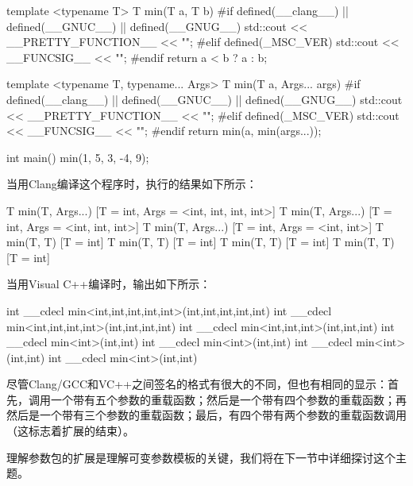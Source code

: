 \begin{cppcode}
template <typename T>
T min(T a, T b)
{
#if defined(__clang__) || defined(__GNUC__) || defined(__GNUG__)
	std::cout << __PRETTY_FUNCTION__ << "\n";
#elif defined(_MSC_VER)
	std::cout << __FUNCSIG__ << "\n";
#endif
	return a < b ? a : b;
}

template <typename T, typename... Args>
T min(T a, Args... args)
{
#if defined(__clang__) || defined(__GNUC__) || defined(__GNUG__)
	std::cout << __PRETTY_FUNCTION__ << "\n";
#elif defined(_MSC_VER)
	std::cout << __FUNCSIG__ << "\n";
#endif
	return min(a, min(args...));
}

int main()
{
	min(1, 5, 3, -4, 9);
}
\end{cppcode}

当用Clang编译这个程序时，执行的结果如下所示：

\begin{cppcode}
T min(T, Args...) [T = int, Args = <int, int, int, int>]
T min(T, Args...) [T = int, Args = <int, int, int>]
T min(T, Args...) [T = int, Args = <int, int>]
T min(T, T) [T = int]
T min(T, T) [T = int]
T min(T, T) [T = int]
T min(T, T) [T = int]
\end{cppcode}

当用Visual C++编译时，输出如下所示：

\begin{cppcode}
int __cdecl min<int,int,int,int,int>(int,int,int,int,int)
int __cdecl min<int,int,int,int>(int,int,int,int)
int __cdecl min<int,int,int>(int,int,int)
int __cdecl min<int>(int,int)
int __cdecl min<int>(int,int)
int __cdecl min<int>(int,int)
int __cdecl min<int>(int,int)
\end{cppcode}

尽管Clang/GCC和VC++之间签名的格式有很大的不同，但也有相同的显示：首先，调用一个带有五个参数的重载函数；然后是一个带有四个参数的重载函数；再然后是一个带有三个参数的重载函数；最后，有四个带有两个参数的重载函数调用（这标志着扩展的结束）。

理解参数包的扩展是理解可变参数模板的关键，我们将在下一节中详细探讨这个主题。



